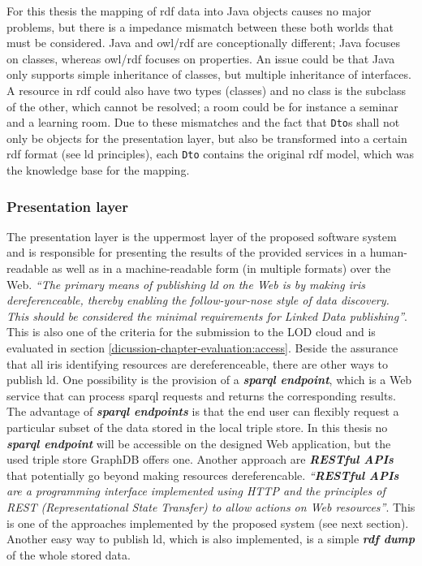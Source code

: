 \documentclass[draft,final]{vutinfth} %
\begin{document}
For this thesis the mapping of \gls{rdf} data into Java objects causes no major problems, but there is a impedance mismatch between these both worlds that must be considered. Java and \gls{owl}/\gls{rdf} are conceptionally different; Java focuses on classes, whereas \gls{owl}/\gls{rdf}  focuses on properties. An issue could be that Java only supports simple inheritance of classes, but multiple inheritance of interfaces. A resource in \gls{rdf} could also have two types (classes) and no class is the subclass of the other, which cannot be resolved; a room could be for instance a seminar and a learning room. Due to these mismatches and the fact that \texttt{Dto}s shall not only be  objects for the presentation layer, but also be transformed into a certain \gls{rdf} format (see \gls{ld} principles), each \texttt{Dto} contains the original \gls{rdf} model, which was the knowledge base for the mapping.

\subsubsection{Presentation layer}
The presentation layer is the uppermost layer of the proposed software system and is responsible for presenting the results of the provided services in a human-readable as well as in a machine-readable form (in multiple formats) over the Web. \textit{``The primary means of publishing \gls{ld} on the Web is by making \gls{iri}s dereferenceable, thereby enabling the follow-your-nose style of data discovery. This should be considered the minimal requirements for Linked Data publishing''}\cite{bizer_emerging_2009}. This is also one of the criteria for the submission to the LOD cloud and is evaluated in section \ref{dicussion-chapter-evaluation:access}. Beside the assurance that all \gls{iri}s identifying resources are dereferenceable, there are other ways to publish \gls{ld}. One possibility is the provision of a \textit{\textbf{\gls{sparql} endpoint}}, which is a Web service that can process \gls{sparql} requests and returns the corresponding results. The advantage of \textit{\textbf{\gls{sparql} endpoints}} is that the end user can flexibly request a particular subset of the data stored in the local triple store. In this thesis no \textit{\textbf{\gls{sparql} endpoint}} will be accessible on the designed Web application, but the used triple store GraphDB offers one. Another approach are \textit{\textbf{RESTful APIs}} that potentially go beyond making resources dereferencable. \textit{``\textbf{RESTful APIs} are a programming interface implemented using HTTP and the principles of REST (Representational State Transfer) to allow actions on Web resources''}\cite{hyland_linked_????}. This is one of the approaches implemented by the proposed system (see next section). Another easy way to publish \gls{ld}, which is also implemented, is a simple \textit{\textbf{\gls{rdf} dump}} of the whole stored data. 
\end{document}
